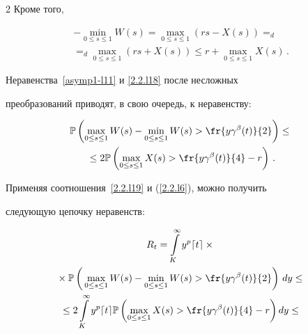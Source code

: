 \begin{multicols}{2}
Кроме того,


\begin{multline}


-\min\limits_{0 \leq s \leq 1} W(s)=\max\limits_{0 \leq s \leq 1} (


rs-X(s))=_d{}\\


{}=_d\max\limits_{0 \leq s \leq 1} (rs+ X(s))


\leq r+ \max\limits_{0 \leq s \leq 1} X(s)\,.\label{2.2.l18}


\end{multline}


Неравенства~\eqref{asymp1-l11} и \eqref{2.2.l18} после несложных


преобразований приводят, в свою очередь, к неравенству:


\begin{multline}


\Pu\left(\max\limits_{0\leq s \leq 1}


W(s)-\min\limits_{0 \leq s \leq 1}W(s)>\fr{y \gamma^\beta(t)}{2}\right) \leq {}\\


{}\leq


2 \Pu\left(\max\limits_{0\leq s \leq 1}X(s)>


\fr{y\gamma^\beta(t)}{4}-r\right)\,. \label{2.2.l19}


\end{multline}


Применяя соотношения~\eqref{2.2.l19} и (\ref{2.2.l6}), можно получить


следующую цепочку неравенств:


\begin{multline}


R_t = \int\limits_{K}^\infty y^p \lceil t


\rceil\times{}\\


{}\times \Pu\left(\vphantom{\fr{\gamma^\beta}{2}}


\max_{0\leq s \leq 1}


W(s)-\min\limits_{0 \leq s \leq 1}W(s)>


\fr{y \gamma^\beta(t)}{2}\right)\,dy \leq{} \\


{}\leq 2 \int\limits_{K}^\infty y^p \lceil


t \rceil\Pu\left(\max\limits_{0\leq s \leq 1}X(s)>\fr{y\gamma^\beta(t)}{4}-r\right)dy \leq{} \\



\end{multline}
\end{multicols}
